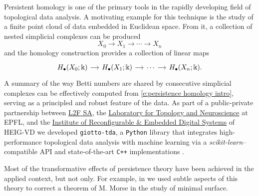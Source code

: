 Persistent homology is one of the primary tools in the rapidly developing field of topological data analysis.
A motivating example for this technique is the study of a finite point cloud of data embedded in Euclidean space.
From it, a collection of nested simplicial complexes can be produced
\begin{equation} \label{e:introduction filtered complex}
X_0 \to X_1 \to \cdots \to X_n
\end{equation}
and the homology construction provides a collection of linear maps
\begin{equation} \label{e:persistence homology intro}
\begin{tikzcd}[column sep = small]
H_\bullet(X_0;\Bbbk) \arrow[r] & H_\bullet(X_{1};\Bbbk) \arrow[r] & \cdots \arrow[r] & H_\bullet(X_n;\Bbbk).
\end{tikzcd}
\end{equation}
A summary of the way Betti numbers are shared by consecutive simplicial complexes can be effectively computed from \eqref{e:persistence homology intro}, serving as a principled and robust feature of the data.
As part of a public-private partnership between \href{https://www.l2f.ch/}{L2F SA}, the \href{https://www.epfl.ch/labs/hessbellwald-lab/}{Laboratory for Topology and Neuroscience} at EPFL, and the \href{https://heig-vd.ch/en/research/reds}{Institute of Reconfigurable \& Embedded Digital Systems} of HEIG-VD we developed \texttt{giotto-tda}, a \texttt{Python} library that integrates high-performance topological data analysis with machine learning via a \emph{scikit-learn}--compatible API and state-of-the-art \texttt{C++} implementations \cite{medina2021giotto}.

Most of the transformative effects of persistence theory have been achieved in the applied context, but not only.
For example, in \cite{medina2021functional} we used subtle aspects of this theory to correct a theorem of M. Morse in the study of minimal surface.

